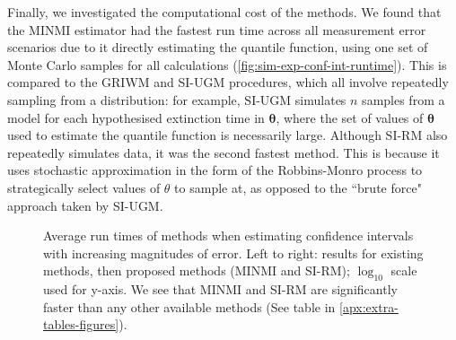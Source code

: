 Finally, we investigated the computational cost of the methods. We found that the MINMI estimator had the fastest run time across all measurement error scenarios due to it directly estimating the quantile function, using one set of Monte Carlo samples for all calculations (\autoref{fig:sim-exp-conf-int-runtime}). This is compared to the GRIWM and SI-UGM procedures, which all involve repeatedly sampling from a distribution: for example, SI-UGM simulates $n$ samples from a model for each hypothesised extinction time in $\bm{\theta}$, where the set of values of $\bm{\theta}$ used to estimate the quantile function is necessarily large. Although SI-RM also repeatedly simulates data, it was the second fastest method. This is because it uses stochastic approximation in the form of the Robbins-Monro process to strategically select values of $\theta$ to sample at, as opposed to the ``brute force" approach taken by SI-UGM.
\begin{figure}[ht]
    \centering
    
    \caption{Average run times of methods when estimating confidence intervals with increasing magnitudes of error. Left to right: results for existing methods, then proposed methods (MINMI and SI-RM); $\log_{10}$ scale used for y-axis. We see that MINMI and SI-RM are significantly faster than any other available methods (See table in \autoref{apx:extra-tables-figures}).}
    \label{fig:sim-exp-conf-int-runtime}
\end{figure}